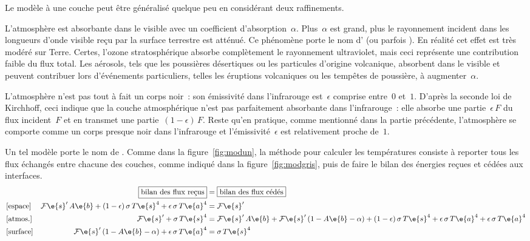 \sk Le modèle à une couche peut être généralisé quelque peu en considérant deux raffinements.
\begin{finger}
\item L'atmosphère est absorbante dans le visible avec un coefficient d'absorption~$\alpha$. Plus~$\alpha$ est grand, plus le rayonnement incident dans les longueurs d'onde visible reçu par la surface terrestre est atténué. Ce phénomène porte le nom d' (ou parfois ). En réalité cet effet est très modéré sur Terre. Certes, l'ozone stratosphérique absorbe complètement le rayonnement ultraviolet, mais ceci représente une contribution faible du flux total. Les aérosols, tels que les poussières désertiques ou les particules d'origine volcanique, absorbent dans le visible et peuvent contribuer lors d'événements particuliers, telles les éruptions volcaniques ou les tempêtes de poussière, à augmenter~$\alpha$.
\item L'atmosphère n'est pas tout à fait un corps noir~: son émissivité dans l'infrarouge est~$\epsilon$ comprise entre~$0$ et~$1$. D'après la seconde loi de Kirchhoff, ceci indique que la couche atmosphérique n'est pas parfaitement absorbante dans l'infrarouge~: elle absorbe une partie~$\epsilon \, F$ du flux incident~$F$ et en transmet une partie~$(1-\epsilon) \, F$. Reste qu'en pratique, comme mentionné dans la partie précédente, l'atmosphère se comporte comme un corps presque noir dans l'infrarouge et l'émissivité~$\epsilon$ est relativement proche de~$1$. 
\end{finger}
Un tel modèle porte le nom de . Comme dans la figure~\ref{fig:modun}, la méthode pour calculer les températures consiste à reporter tous les flux échangés entre chacune des couches, comme indiqué dans la figure~\ref{fig:modgris}, puis de faire le bilan des énergies reçues et cédées aux interfaces.
\[ \begin{aligned} & & \boxed{\text{bilan des flux reçus}} & = \boxed{\text{bilan des flux cédés}} \\ 
& \text{[espace]} & \mathcal{F}\e{s}'\,A\e{b} + (1-\epsilon) \, \sigma \, {T\e{s}}^4 + \epsilon \, \sigma \, {T\e{a}}^4 & = \mathcal{F}\e{s}' \\
& \text{[atmos.]} & \mathcal{F}\e{s}' + \sigma \, {T\e{s}}^4 & = \mathcal{F}\e{s}'\,A\e{b} + \mathcal{F}\e{s}'\,(1-A\e{b}-\alpha) + (1-\epsilon) \, \sigma \, {T\e{s}}^4 + \epsilon \, \sigma \, {T\e{a}}^4 + \epsilon \, \sigma \, {T\e{a}}^4 \\ 
& \text{[surface]} & \mathcal{F}\e{s}'\,(1-A\e{b}-\alpha) + \epsilon \, \sigma \, {T\e{a}}^4 & = \sigma \, {T\e{s}}^4 \\ \end{aligned} \]

